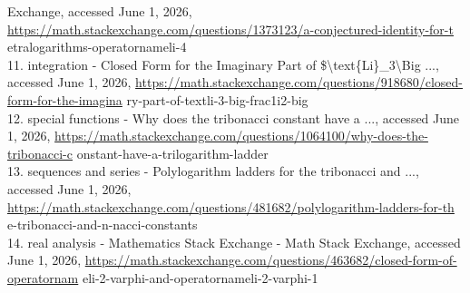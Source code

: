 \documentclass[10pt]{article}
\begin{document}
Exchange, accessed June 1, 2026, \href{https://math.stackexchange.com/questions/1373123/a-conjectured-identity-for-t}{https://math.stackexchange.com/questions/1373123/a-conjectured-identity-for-t} etralogarithms-operatornameli-4\\
11. integration - Closed Form for the Imaginary Part of \$\textbackslash text\{Li\}\_3\textbackslash Big ..., accessed June 1, 2026, \href{https://math.stackexchange.com/questions/918680/closed-form-for-the-imagina}{https://math.stackexchange.com/questions/918680/closed-form-for-the-imagina} ry-part-of-textli-3-big-frac1i2-big\\
12. special functions - Why does the tribonacci constant have a ..., accessed June 1, 2026, \href{https://math.stackexchange.com/questions/1064100/why-does-the-tribonacci-c}{https://math.stackexchange.com/questions/1064100/why-does-the-tribonacci-c} onstant-have-a-trilogarithm-ladder\\
13. sequences and series - Polylogarithm ladders for the tribonacci and ..., accessed June 1, 2026, \href{https://math.stackexchange.com/questions/481682/polylogarithm-ladders-for-th}{https://math.stackexchange.com/questions/481682/polylogarithm-ladders-for-th} e-tribonacci-and-n-nacci-constants\\
14. real analysis - Mathematics Stack Exchange - Math Stack Exchange, accessed June 1, 2026, \href{https://math.stackexchange.com/questions/463682/closed-form-of-operatornam}{https://math.stackexchange.com/questions/463682/closed-form-of-operatornam} eli-2-varphi-and-operatornameli-2-varphi-1
\end{document}
